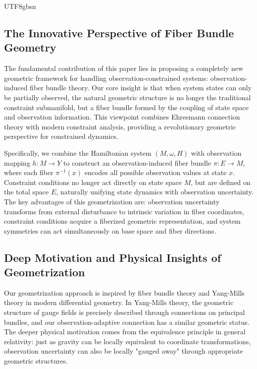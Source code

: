 \documentclass[a4paper,12pt]{extarticle}
\theoremstyle{definition}
\begin{document}
\begin{CJK}{UTF8}{gbsn}
\subsection{The Innovative Perspective of Fiber Bundle Geometry}

The fundamental contribution of this paper lies in proposing a completely new geometric framework for handling observation-constrained systems: observation-induced fiber bundle theory. Our core insight is that when system states can only be partially observed, the natural geometric structure is no longer the traditional constraint submanifold, but a fiber bundle formed by the coupling of state space and observation information. This viewpoint combines Ehresmann connection theory\cite{ehresmann1950connexions} with modern constraint analysis, providing a revolutionary geometric perspective for constrained dynamics.

Specifically, we combine the Hamiltonian system $(M, \omega, H)$ with observation mapping $h: M \to Y$ to construct an observation-induced fiber bundle $\pi: E \to M$, where each fiber $\pi^{-1}(x)$ encodes all possible observation values at state $x$. Constraint conditions no longer act directly on state space $M$, but are defined on the total space $E$, naturally unifying state dynamics with observation uncertainty. The key advantages of this geometrization are: observation uncertainty transforms from external disturbance to intrinsic variation in fiber coordinates, constraint conditions acquire a fiberized geometric representation, and system symmetries can act simultaneously on base space and fiber directions.

\subsection{Deep Motivation and Physical Insights of Geometrization}

Our geometrization approach is inspired by fiber bundle theory\cite{steenrod1951topology} and Yang-Mills theory\cite{yang1954conservation} in modern differential geometry. In Yang-Mills theory, the geometric structure of gauge fields is precisely described through connections on principal bundles, and our observation-adaptive connection has a similar geometric status. The deeper physical motivation comes from the equivalence principle in general relativity: just as gravity can be locally equivalent to coordinate transformations, observation uncertainty can also be locally "gauged away" through appropriate geometric structures.


\end{CJK}
\end{document}
